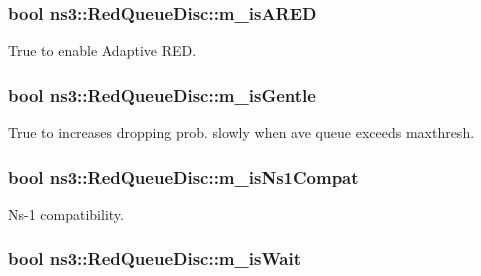 \subsubsection[{\texorpdfstring{m\+\_\+is\+A\+R\+ED}{m_isARED}}]{\setlength{\rightskip}{0pt plus 5cm}bool ns3\+::\+Red\+Queue\+Disc\+::m\+\_\+is\+A\+R\+ED\hspace{0.3cm}{\ttfamily [private]}}\hypertarget{classns3_1_1RedQueueDisc_a27b33901dccd8e52d8cbe9798ea70139}{}\label{classns3_1_1RedQueueDisc_a27b33901dccd8e52d8cbe9798ea70139}


True to enable Adaptive R\+ED. 

\subsubsection[{\texorpdfstring{m\+\_\+is\+Gentle}{m_isGentle}}]{\setlength{\rightskip}{0pt plus 5cm}bool ns3\+::\+Red\+Queue\+Disc\+::m\+\_\+is\+Gentle\hspace{0.3cm}{\ttfamily [private]}}\hypertarget{classns3_1_1RedQueueDisc_ad9c91813fb21151ac137681a2b1fb0c8}{}\label{classns3_1_1RedQueueDisc_ad9c91813fb21151ac137681a2b1fb0c8}


True to increases dropping prob. slowly when ave queue exceeds maxthresh. 

\subsubsection[{\texorpdfstring{m\+\_\+is\+Ns1\+Compat}{m_isNs1Compat}}]{\setlength{\rightskip}{0pt plus 5cm}bool ns3\+::\+Red\+Queue\+Disc\+::m\+\_\+is\+Ns1\+Compat\hspace{0.3cm}{\ttfamily [private]}}\hypertarget{classns3_1_1RedQueueDisc_a9586d035322ac6e72918bc884a5b017e}{}\label{classns3_1_1RedQueueDisc_a9586d035322ac6e72918bc884a5b017e}


Ns-\/1 compatibility. 

\subsubsection[{\texorpdfstring{m\+\_\+is\+Wait}{m_isWait}}]{\setlength{\rightskip}{0pt plus 5cm}bool ns3\+::\+Red\+Queue\+Disc\+::m\+\_\+is\+Wait\hspace{0.3cm}{\ttfamily [private]}}\hypertarget{classns3_1_1RedQueueDisc_a581b90ab14e1387a63b11dd7d03a3e00}{}\label{classns3_1_1RedQueueDisc_a581b90ab14e1387a63b11dd7d03a3e00}


